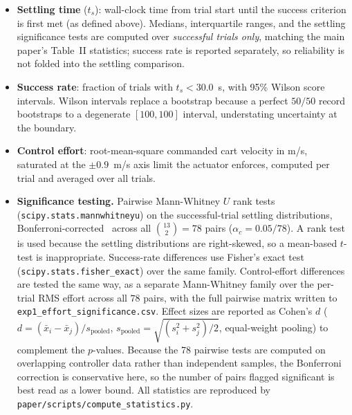 \begin{itemize}
    \item \textbf{Settling time} ($t_s$): wall-clock time from trial start
    until the success criterion is first met (as defined above). Medians,
    interquartile ranges, and the settling significance tests are computed
    over \emph{successful trials only}, matching the main paper's Table~II
    statistics; success rate is reported separately, so reliability is not
    folded into the settling comparison.

    \item \textbf{Success rate}: fraction of trials with $t_s < 30.0$~s,
    with 95\% Wilson score intervals. Wilson intervals replace a bootstrap
    because a perfect $50/50$ record bootstraps to a degenerate
    $[100, 100]$ interval, understating uncertainty at the boundary.

    \item \textbf{Control effort}: root-mean-square commanded cart
    velocity in m/s, saturated at the $\pm 0.9$~m/s axis limit the
    actuator enforces, computed per trial and averaged over all trials.

    \item \textbf{Significance testing.}
    Pairwise Mann-Whitney $U$ rank tests
    (\texttt{scipy.stats.mannwhitneyu}) on the successful-trial
    settling distributions, Bonferroni-corrected~\cite{bonferroni1936teoria}
    across all $\binom{13}{2}=78$ pairs ($\alpha_c = 0.05/78$). A rank test
    is used because the settling distributions are right-skewed, so a
    mean-based $t$-test is inappropriate. Success-rate differences use
    Fisher's exact test (\texttt{scipy.stats.fisher\_exact}) over the same
    family. Control-effort differences are tested the same way, as a separate
Mann-Whitney family over the per-trial RMS effort across all $78$ pairs, with
the full pairwise matrix written to \texttt{exp1\_effort\_significance.csv}.
Effect sizes are reported as Cohen's $d$
    ($d = (\bar{x}_i - \bar{x}_j)/s_{\mathrm{pooled}}$,
    $s_{\mathrm{pooled}} = \sqrt{(s_i^2 + s_j^2)/2}$, equal-weight pooling)
    to complement the $p$-values. Because the 78 pairwise tests are computed
    on overlapping controller data rather than independent samples, the
    Bonferroni correction is conservative here, so the number of pairs flagged
    significant is best read as a lower bound. All statistics are reproduced by
    \texttt{paper/scripts/compute\_statistics.py}.
\end{itemize}

